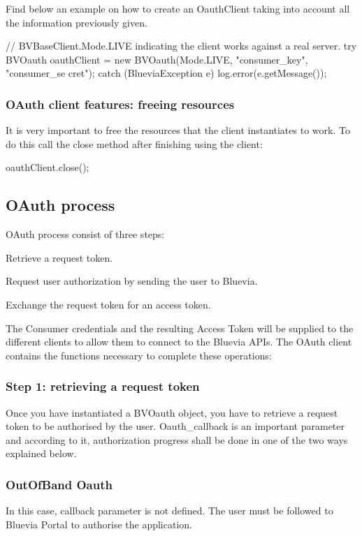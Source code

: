 Find below an example on how to create an OauthClient taking into account all the information previously given.


\begin{DoxyCode}
// BVBaseClient.Mode.LIVE indicating the client works against a real server.
try {
        BVOauth oauthClient = new BVOauth(Mode.LIVE, "consumer_key", "consumer_se
      cret");
} catch (BlueviaException e){
        log.error(e.getMessage());
}
\end{DoxyCode}
\hypertarget{blv_oauth_guide_oauthclient_features_freeing_resources_sec}{}\subsubsection{OAuth client features: freeing resources}\label{blv_oauth_guide_oauthclient_features_freeing_resources_sec}
It is very important to free the resources that the client instantiates to work. To do this call the close method after finishing using the client:


\begin{DoxyCode}
oauthClient.close();
\end{DoxyCode}
\hypertarget{blv_oauth_guide_oauth_process_sec}{}\subsection{OAuth process}\label{blv_oauth_guide_oauth_process_sec}
OAuth process consist of three steps:


\begin{DoxyItemize}
\item Retrieve a request token. 
\item Request user authorization by sending the user to Bluevia. 
\item Exchange the request token for an access token. 
\end{DoxyItemize}

The Consumer credentials and the resulting Access Token will be supplied to the different clients to allow them to connect to the Bluevia APIs. The OAuth client contains the functions necessary to complete these operations:\hypertarget{blv_oauth_guide_retrieving_request_token_sec}{}\subsubsection{Step 1: retrieving a request token}\label{blv_oauth_guide_retrieving_request_token_sec}
Once you have instantiated a BVOauth object, you have to retrieve a request token to be authorised by the user. Oauth\_\-callback is an important parameter and according to it, authorization progress shall be done in one of the two ways explained below.\hypertarget{blv_oauth_guide_retrieving_request_token_sec_oob}{}\subsubsection{OutOfBand Oauth}\label{blv_oauth_guide_retrieving_request_token_sec_oob}
In this case, callback parameter is not defined. The user must be followed to Bluevia Portal to authorise the application.


